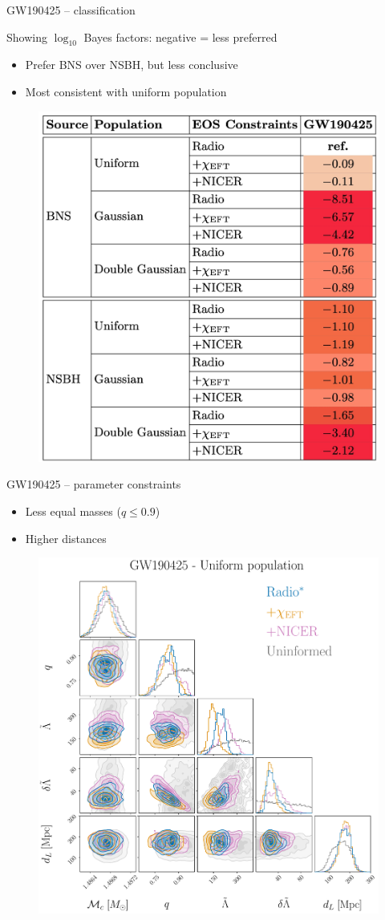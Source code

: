 \documentclass[usenames,dvipsnames,t]{beamer}
\begin{document}
\begin{frame}{GW190425 -- classification}

  Showing $\log_{10}$ Bayes factors: negative = less preferred
  \begin{itemize}
    \item Prefer BNS over NSBH, but less conclusive
    \item Most consistent with uniform population
  \end{itemize}

  \begin{figure}
    \centering
    \includegraphics[width=0.50\linewidth]{Figures/GW190425_EOS_source_classification.jpg}
  \end{figure}
\end{frame}

\begin{frame}{GW190425 -- parameter constraints}

  \begin{itemize}
    \item Less equal masses ($q\leq 0.9$)
    \item Higher distances
  \end{itemize}

  \begin{figure}
    \centering
    \includegraphics[width=0.525\linewidth]{Figures/GW190425_corner_uniform_bns_PRESENTATION.pdf}
  \end{figure}
\end{frame}
\end{document}
